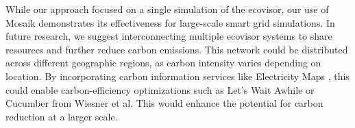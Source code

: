 While our approach focused on a single simulation of the ecovisor, our use of
Mosaik demonstrates its effectiveness for large-scale smart grid simulations. In
future research, we suggest interconnecting multiple ecovisor systems to share
resources and further reduce carbon emissions. This network could be distributed
across different geographic regions, as carbon intensity varies depending on
location. By incorporating carbon information services like Electricity Maps
\cite{electricity_maps}, this could enable carbon-efficiency optimizations such
as Let’s Wait Awhile \cite{wiesner2021} or Cucumber \cite{wiesner2022} from
Wiesner et al. This would enhance the potential for carbon reduction at a larger
scale.
